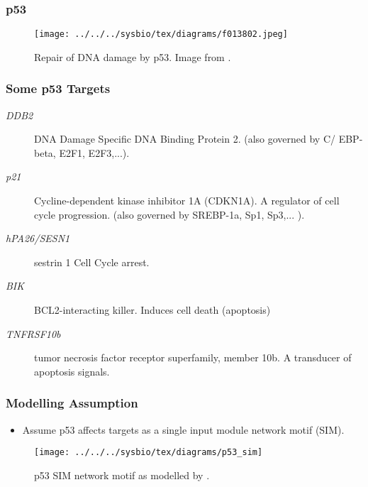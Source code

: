 \begin{frame}
  \frametitle{p53}

  \begin{figure}
    \begin{centering}
      \texttt{[image: ../../../sysbio/tex/diagrams/f013802.jpeg]}
      \par\end{centering}

    \caption{Repair of DNA damage by p53. Image from \citet{Goodsell:p53tumor99}.}
  \end{figure}
\end{frame}


\begin{frame}
  \frametitle{Some p53 Targets}
  \begin{description}
  \item [{\emph{DDB2}}] DNA Damage Specific DNA Binding Protein 2. (also
    governed by C/ EBP-beta, E2F1, E2F3,...).
  \item [{\emph{p21}}] Cycline-dependent kinase inhibitor 1A (CDKN1A). A
    regulator of cell cycle progression. (also governed by SREBP-1a,
    Sp1, Sp3,... ).
  \item [{\emph{hPA26/SESN1}}] sestrin 1 Cell Cycle arrest.
  \item [{\emph{BIK}}] BCL2-interacting killer. Induces cell death (apoptosis)
  \item [{\emph{TNFRSF10b}}] tumor necrosis factor receptor superfamily,
    member 10b. A transducer of apoptosis signals.
  \end{description}
  
\end{frame}


\begin{frame}
  \frametitle{Modelling Assumption}
  \begin{itemize}
  \item Assume p53 affects targets as a single input module network motif
    (SIM).
  \end{itemize}
  \begin{figure}


    \begin{centering}
      \texttt{[image: ../../../sysbio/tex/diagrams/p53\_sim]}
    \end{centering}
    
    \caption{p53 SIM network motif as modelled by \citealt{Barenco:ranked06}.}
    
  \end{figure}
\end{frame}
